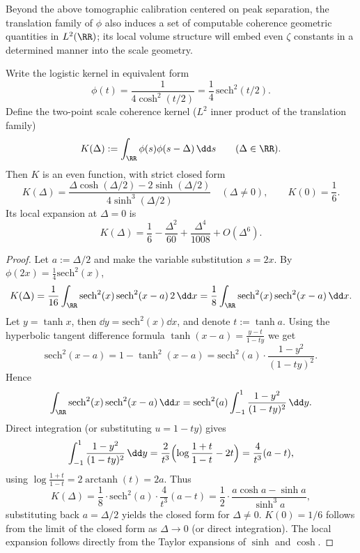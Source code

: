 Beyond the above tomographic calibration centered on peak separation, the translation family of \(\phi\) also induces a set of computable coherence geometric quantities in \(L^2(\RR)\); its local volume structure will embed even \(\zeta\) constants in a determined manner into the scale geometry.

\begin{proposition}\label{prop:xi-scale-coherence-kernel-closed-form}
Write the logistic kernel in equivalent form
\[
\phi(t)=\frac{1}{4\cosh^2(t/2)}=\frac{1}{4}\,\mathrm{sech}^2(t/2).
\]
Define the two-point scale coherence kernel (\(L^2\) inner product of the translation family)
\[
K(\Delta):=\int_{\RR}\phi(s)\phi(s-\Delta)\,\dd s\qquad(\Delta\in\RR).
\]
Then \(K\) is an even function, with strict closed form
\[
\boxed{\;
K(\Delta)=\frac{\Delta\cosh(\Delta/2)-2\sinh(\Delta/2)}{4\sinh^3(\Delta/2)}\quad(\Delta\neq 0),
\qquad
K(0)=\frac{1}{6}.\;}
\]
Its local expansion at \(\Delta=0\) is
\[
K(\Delta)=\frac{1}{6}-\frac{\Delta^2}{60}+\frac{\Delta^4}{1008}+O(\Delta^6).
\]
\end{proposition}
\begin{proof}
Let \(a:=\Delta/2\) and make the variable substitution \(s=2x\). By \(\phi(2x)=\frac14\mathrm{sech}^2(x)\),
\[
K(\Delta)=\frac{1}{16}\int_{\RR}\mathrm{sech}^2(x)\,\mathrm{sech}^2(x-a)\,2\,\dd x
=\frac18\int_{\RR}\mathrm{sech}^2(x)\,\mathrm{sech}^2(x-a)\,\dd x.
\]
Let \(y=\tanh x\), then \(\dd y=\mathrm{sech}^2(x)\dd x\), and denote \(t:=\tanh a\).
Using the hyperbolic tangent difference formula
\(
\tanh(x-a)=\frac{y-t}{1-ty}
\)
we get
\[
\mathrm{sech}^2(x-a)=1-\tanh^2(x-a)=\mathrm{sech}^2(a)\cdot\frac{1-y^2}{(1-ty)^2}.
\]
Hence
\[
\int_{\RR}\mathrm{sech}^2(x)\,\mathrm{sech}^2(x-a)\,\dd x
=\mathrm{sech}^2(a)\int_{-1}^{1}\frac{1-y^2}{(1-ty)^2}\,\dd y.
\]
Direct integration (or substituting \(u=1-ty\)) gives
\[
\int_{-1}^{1}\frac{1-y^2}{(1-ty)^2}\,\dd y
=\frac{2}{t^3}\Bigl(\log\frac{1+t}{1-t}-2t\Bigr)
=\frac{4}{t^3}(a-t),
\]
using \(\log\frac{1+t}{1-t}=2\operatorname{arctanh}(t)=2a\).
Thus
\[
K(\Delta)
=\frac18\cdot \mathrm{sech}^2(a)\cdot \frac{4}{t^3}(a-t)
=\frac12\cdot\frac{a\cosh a-\sinh a}{\sinh^3 a},
\]
substituting back \(a=\Delta/2\) yields the closed form for \(\Delta\neq 0\).
\(K(0)=1/6\) follows from the limit of the closed form as \(\Delta\to 0\) (or direct integration).
The local expansion follows directly from the Taylor expansions of \(\sinh\) and \(\cosh\).
\end{proof}

